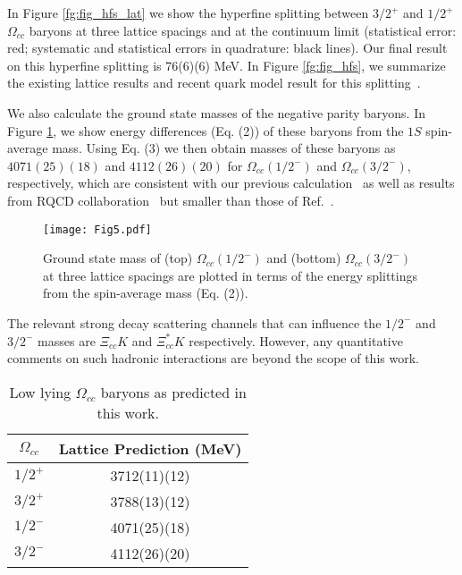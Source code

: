 \documentclass[showkeys,aps,twocolumn,showpacs,preprintnumbers,amsmath,amssymb,prl,letterpaper,floatfix,nofootinbib,superscriptaddress,]{revtex4-1}
\newcommand\bef{\begin{figure}}
\newcommand\eef[1]{\label{fg:#1}\end{figure}}
\newcommand\bet{\begin{table}}
\newcommand\eet[1]{\label{tb:#1}\end{table}}
\newcommand\fgn[1]{Figure \ref{fg:#1}}
\begin{document}
{{In \fgn{fig_hfs_lat} we show the  hyperfine splitting between $3/2^{+}$ and $1/2^{+}$ $\Omega_{cc}$ baryons at three lattice spacings and at the continuum limit (statistical error: red; systematic and statistical errors in quadrature: black lines). 
 Our final result on this hyperfine splitting is 76(6)(6) MeV. In \fgn{fig_hfs}, we summarize the existing lattice results and recent quark model result for this splitting~\cite{Lewis:2001iz,Mathur:2002ce,Liu:2009jc,Briceno:2012wt,Basak:2012py,Basak:2013oya,Namekawa:2013vu,Brown:2014ena,Bali:2015lka,Padmanath:2015jea,Chen:2017kxr,Alexandrou:2017xwd,Mondal:2017nhw,Karliner:2018hos}.



We also calculate the ground state masses of the negative parity baryons. In \fgn{fig_split_n}, we show energy differences (Eq. (2)) of these baryons from the $1S$ spin-average mass.
 Using Eq. (3) we then obtain masses of these baryons as $4071(25)(18)$ and $4112(26)(20)$ for $\Omega_{cc}(1/2^{-})$ and $\Omega_{cc}(3/2^{-})$, respectively, which are consistent with our previous calculation~\cite{Padmanath:2015jea} as well as results from RQCD collaboration~\cite{Bali:2015lka} but smaller than those of Ref.~\cite{Chen:2017kxr}.
\bef[tbh]
\centering
\texttt{[image: Fig5.pdf]}
\vspace*{-0.09in}
\caption{Ground state mass of (top) $\Omega_{cc}(1/2^{-})$ and (bottom) $\Omega_{cc}(3/2^{-})$ at three lattice spacings are plotted in terms of the energy splittings from the spin-average mass (Eq. (2)).}
\eef{fig_split_n}
The relevant strong decay scattering channels that can influence the $1/2^-$ and 
$3/2^-$ masses are $\Xi_{cc}K$ and $\Xi_{cc}^*K$ respectively. However, any quantitative comments on such hadronic  interactions are beyond the scope of this work.
%
\bet[h]
\centering
\begin{tabular}{c|c }
$\Omega_{cc}$ & Lattice Prediction (MeV)\\
\hline
$1/2^{+}$ & 3712(11)(12)  \\
$3/2^{+}$ & 3788(13)(12)  \\
$1/2^{-}$ & 4071(25)(18)  \\
$3/2^{-}$ & 4112(26)(20)  \\
\hline
\end{tabular}
\caption{Low lying $\Omega_{cc}$ baryons as predicted in this work.}
\eet{summary_table}



}}
\end{document}
